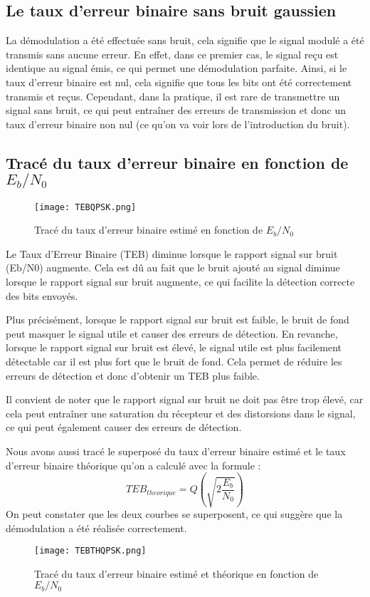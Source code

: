 \documentclass[11pt]{article}
\begin{document}
\subsection{Le taux d'erreur binaire sans bruit gaussien}
La démodulation a été effectuée sans bruit, cela signifie que le signal modulé a été transmis sans aucune erreur. En effet, dans ce premier cas, le signal reçu est identique au signal émis, ce qui permet une démodulation parfaite. Ainsi, si le taux d'erreur binaire est nul, cela signifie que tous les bits ont été correctement transmis et reçus. Cependant, dans la pratique, il est rare de transmettre un signal sans bruit, ce qui peut entraîner des erreurs de transmission et donc un taux d'erreur binaire non nul (ce qu'on va voir lors de l'introduction du bruit).

\subsection{Tracé du taux d'erreur binaire en fonction de $E_b/N_0$}

\begin{figure}[ht!]
    \centering
    \texttt{[image: TEBQPSK.png]}
    \caption{Tracé du taux d'erreur binaire estimé en fonction de $E_b/N_0$  \label{fig : TEBQPSK}}
\end{figure}


Le Taux d'Erreur Binaire (TEB) diminue lorsque le rapport signal sur bruit (Eb/N0) augmente. Cela est dû au fait que le bruit ajouté au signal diminue lorsque le rapport signal sur bruit augmente, ce qui facilite la détection correcte des bits envoyés.

Plus précisément, lorsque le rapport signal sur bruit est faible, le bruit de fond peut masquer le signal utile et causer des erreurs de détection. En revanche, lorsque le rapport signal sur bruit est élevé, le signal utile est plus facilement détectable car il est plus fort que le bruit de fond. Cela permet de réduire les erreurs de détection et donc d'obtenir un TEB plus faible.

Il convient de noter que le rapport signal sur bruit ne doit pas être trop élevé, car cela peut entraîner une saturation du récepteur et des distorsions dans le signal, ce qui peut également causer des erreurs de détection.

Nous avons aussi tracé le superposé du taux d'erreur binaire estimé et le taux d'erreur binaire théorique qu'on a calculé avec la formule :
$$TEB_{theorique} = Q(\sqrt{2\frac{E_b}{N_0}})$$
On peut constater que les deux courbes se superposent, ce qui suggère que la démodulation a été réalisée correctement.\\
\begin{figure}[ht!]
    \centering
    \texttt{[image: TEBTHQPSK.png]}
    \caption{Tracé du taux d'erreur binaire estimé et théorique en fonction de $E_b/N_0$  \label{fig : TEBQPSK}}
\end{figure}
\end{document}
